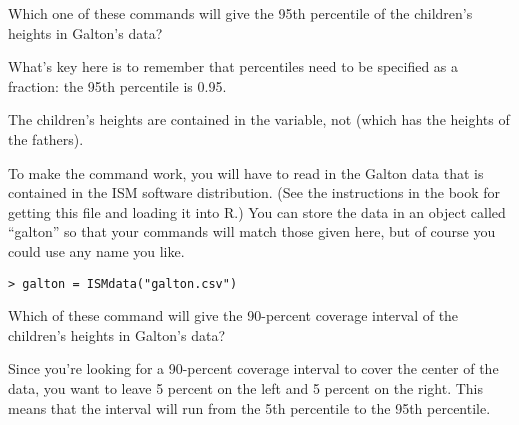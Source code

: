 

Which one of these commands will give the 95th percentile of the
children's heights in Galton's data? \datasetGalton

\begin{MultipleChoice}
\end{MultipleChoice}

\begin{AnswerText}
What's key here is to remember that percentiles need to be specified
as a fraction: the 95th percentile is 0.95.

The children's heights are contained in the  variable, not
 (which has the heights of the fathers).

To make the command work, you will have to read in the Galton data
that is contained in the ISM software distribution.  (See the
instructions in the book for getting this file and loading it into R.)
You can store the data in an object called ``galton'' so that your
commands will match those given here, but of course you could use any
name you like.
\begin{verbatim}
> galton = ISMdata("galton.csv")
\end{verbatim}
\end{AnswerText}

\bigskip

\noindent Which of these command will give the 90-percent coverage interval of the children's heights in Galton's data?

\begin{MultipleChoice}
\end{MultipleChoice}

\begin{AnswerText}
Since you're looking for a 90-percent coverage interval to cover the
center of the data, you want to
leave 5 percent on the left and 5 percent on the right.  This means
that the interval will run from the 5th percentile to the 95th percentile.
\end{AnswerText}

